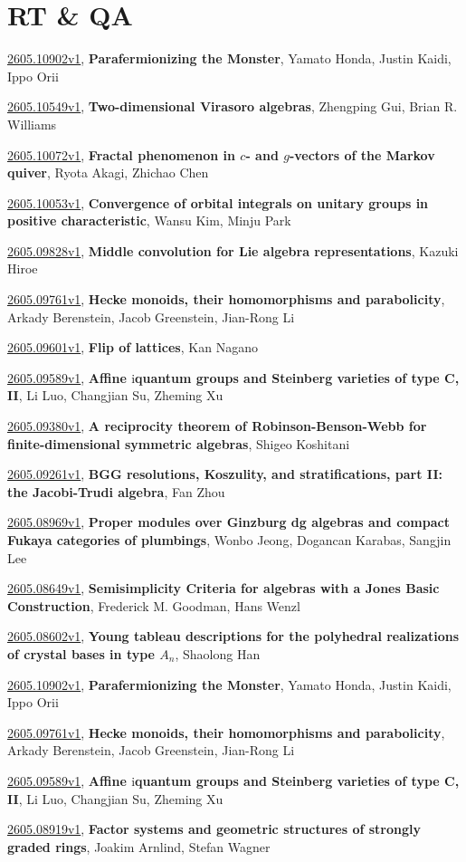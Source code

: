 \documentclass[9pt, a4paper]{article}
\theoremstyle{plain}
\theoremstyle{definition}
\theoremstyle{remark}
\newcommand{\arxiv}[3]{\href{https://arxiv.org/abs/#1}{#1}, \textbf{\textcolor{arxivblue}{#2}}, #3}
\begin{document}
\section{RT \& QA}
\arxiv{2605.10902v1}{Parafermionizing the Monster}{Yamato Honda, Justin Kaidi, Ippo Orii}

\arxiv{2605.10549v1}{Two-dimensional Virasoro algebras}{Zhengping Gui, Brian R. Williams}

\arxiv{2605.10072v1}{Fractal phenomenon in $c$- and $g$-vectors of the Markov quiver}{Ryota Akagi, Zhichao Chen}

\arxiv{2605.10053v1}{Convergence of orbital integrals on unitary groups in positive characteristic}{Wansu Kim, Minju Park}

\arxiv{2605.09828v1}{Middle convolution for Lie algebra representations}{Kazuki Hiroe}

\arxiv{2605.09761v1}{Hecke monoids, their homomorphisms and parabolicity}{Arkady Berenstein, Jacob Greenstein, Jian-Rong Li}

\arxiv{2605.09601v1}{Flip of lattices}{Kan Nagano}

\arxiv{2605.09589v1}{Affine $\mathrm{i}$quantum groups and Steinberg varieties of type C, II}{Li Luo, Changjian Su, Zheming Xu}

\arxiv{2605.09380v1}{A reciprocity theorem of Robinson-Benson-Webb for finite-dimensional symmetric algebras}{Shigeo Koshitani}

\arxiv{2605.09261v1}{BGG resolutions, Koszulity, and stratifications, part II: the Jacobi-Trudi algebra}{Fan Zhou}

\arxiv{2605.08969v1}{Proper modules over Ginzburg dg algebras and compact Fukaya categories of plumbings}{Wonbo Jeong, Dogancan Karabas, Sangjin Lee}

\arxiv{2605.08649v1}{Semisimplicity Criteria for algebras with a Jones Basic Construction}{Frederick M. Goodman, Hans Wenzl}

\arxiv{2605.08602v1}{Young tableau descriptions for the polyhedral realizations of crystal bases in type $A_n$}{Shaolong Han}

\arxiv{2605.10902v1}{Parafermionizing the Monster}{Yamato Honda, Justin Kaidi, Ippo Orii}

\arxiv{2605.09761v1}{Hecke monoids, their homomorphisms and parabolicity}{Arkady Berenstein, Jacob Greenstein, Jian-Rong Li}

\arxiv{2605.09589v1}{Affine $\mathrm{i}$quantum groups and Steinberg varieties of type C, II}{Li Luo, Changjian Su, Zheming Xu}

\arxiv{2605.08919v1}{Factor systems and geometric structures of strongly graded rings}{Joakim Arnlind, Stefan Wagner}

\end{document}
